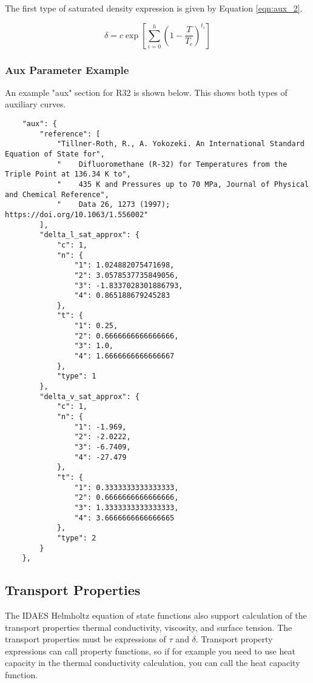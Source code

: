 \documentclass[oneside]{book}
\begin{document}
The first type of saturated density expression is given by Equation \ref{eqn:aux_2}.

\begin{equation}\label{eqn:aux_2}
	\delta = c \exp \left[ \sum_{i=0}^h \left(1 - \frac{T}{T_c} \right)^{t_i} \right] 
\end{equation}

\subsubsection{Aux Parameter Example}

An example "aux" section for R32 is shown below.  This shows both types of auxiliary curves.

\begin{verbatim}
    "aux": {
        "reference": [
            "Tillner-Roth, R., A. Yokozeki. An International Standard Equation of State for",
            "    Difluoromethane (R-32) for Temperatures from the Triple Point at 136.34 K to",
            "    435 K and Pressures up to 70 MPa, Journal of Physical and Chemical Reference",
            "    Data 26, 1273 (1997); https://doi.org/10.1063/1.556002"
        ],
        "delta_l_sat_approx": {
            "c": 1,
            "n": {
                "1": 1.024882075471698,
                "2": 3.0578537735849056,
                "3": -1.8337028301886793,
                "4": 0.865188679245283
            },
            "t": {
                "1": 0.25,
                "2": 0.6666666666666666,
                "3": 1.0,
                "4": 1.6666666666666667
            },
            "type": 1
        },
        "delta_v_sat_approx": {
            "c": 1,
            "n": {
                "1": -1.969,
                "2": -2.0222,
                "3": -6.7409,
                "4": -27.479
            },
            "t": {
                "1": 0.3333333333333333,
                "2": 0.6666666666666666,
                "3": 1.3333333333333333,
                "4": 3.6666666666666665
            },
            "type": 2
        }
    },
\end{verbatim}

\subsection{Transport Properties}

The IDAES Helmholtz equation of state functions also support calculation of the transport properties thermal conductivity, viscosity, and surface tension. The transport properties must be expressions of $\tau$ and $\delta$.  Transport property expressions can call property functions, so if for example you need to use heat capacity in the thermal conductivity calculation, you can call the heat capacity function. 
\end{document}
